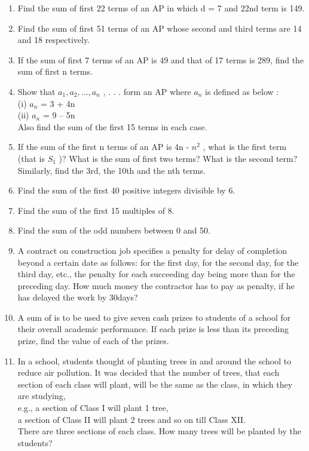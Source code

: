 \begin{enumerate}[label=\arabic*.,ref=\thesubsection.\theenumi]
\item Find the sum of first 22 terms of an AP in which d = 7 and 22nd term is 149.
\item Find the sum of first 51 terms of an AP whose second and third terms are 14 and 18 respectively.
\item If the sum of first 7 terms of an AP is 49 and that of 17 terms is 289, find the sum of first n terms. 
\item Show that $a_1 , a_2 , . . ., a_n$ , . . . form an AP where $a_n$ is defined as below :\\
(i) $a_n$ = 3 + 4n\\
(ii) $a_n$ = 9 – 5n\\
Also find the sum of the first 15 terms in each case.
\item If the sum of the first n terms of an AP is 4n - $n^2$ , what is the first term (that is $S_1$ )? What
is the sum of first two terms? What is the second term? Similarly, find the 3rd, the 10th and
the nth terms.
\item Find the sum of the first 40 positive integers divisible by 6.
\item Find the sum of the first 15 multiples of 8.
\item Find the sum of the odd numbers between 0 and 50.
\item A contract on construction job specifies a penalty for delay of completion beyond a
certain date as follows:  for the first day, for the second day,  for the third
day, etc., the penalty for each succeeding day being  more than for the preceding day. How much money the contractor has to pay as penalty, if he has delayed the work by 30days?
\item A sum of  is to be used to give seven cash prizes to students of a school for their overall academic performance. If each prize is  less than its preceding prize, find the value of each of the prizes.
\item  In a school, students thought of planting trees in and around the school to reduce air pollution. It was decided that the number of trees, that each section of each class will plant, will be the same as the class, in which they are studying, \\
e.g., a section of Class I will plant 1 tree, \\
a section of Class II will plant 2 trees and so on till Class XII.\\ There are three sections of each class. How many trees will be planted by the students?

\end{enumerate}
